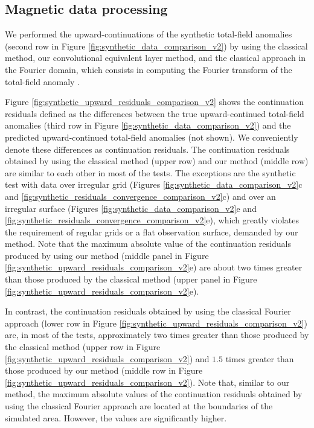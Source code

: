 \documentclass[manuscript,noblind]{geophysics}
\begin{document}
\subsection*{Magnetic data processing}

We performed the upward-continuations of the synthetic total-field anomalies 
(second row in Figure \ref{fig:synthetic_data_comparison_v2}) by using 
the classical method, our convolutional equivalent layer method, and 
the classical approach in the Fourier domain,
which consists in computing the Fourier transform of the total-field anomaly 
\citep[e.g.,][ p. 317]{blakely1996}. 

Figure \ref{fig:synthetic_upward_residuals_comparison_v2} shows the continuation residuals defined as the differences
between the true upward-continued total-field anomalies (third row in Figure
\ref{fig:synthetic_data_comparison_v2}) and the predicted upward-continued total-field 
anomalies (not shown). We conveniently denote these differences as continuation
residuals.
The continuation residuals 
obtained by using the classical method (upper row) and our method (middle row) are 
similar to each other in most of the tests.
The exceptions are the synthetic test with data over irregular grid (Figures \ref{fig:synthetic_data_comparison_v2}c and \ref{fig:synthetic_residuals_convergence_comparison_v2}c) and over an irregular surface 
(Figures \ref{fig:synthetic_data_comparison_v2}e and 
\ref{fig:synthetic_residuals_convergence_comparison_v2}e), which greatly violates the 
requirement of regular grids or a flat observation surface, demanded by our method.
Note that the maximum absolute value of the continuation residuals produced by using our 
method (middle panel in Figure \ref{fig:synthetic_upward_residuals_comparison_v2}e) 
are about two times greater than those produced by the classical method 
(upper panel in Figure \ref{fig:synthetic_upward_residuals_comparison_v2}e).

In contrast, the continuation residuals obtained by using the 
classical Fourier approach (lower row in Figure \ref{fig:synthetic_upward_residuals_comparison_v2})
are, in most of the tests, approximately two times greater than those produced by the classical method 
(upper row in Figure \ref{fig:synthetic_upward_residuals_comparison_v2}) and $1.5$ times greater than
those produced by our method (middle row in Figure \ref{fig:synthetic_upward_residuals_comparison_v2}).
Note that, similar to our method, the maximum absolute values of the continuation residuals 
obtained by using the classical Fourier approach are located at the boundaries of the simulated area.
However, the values are significantly higher.
\end{document}

